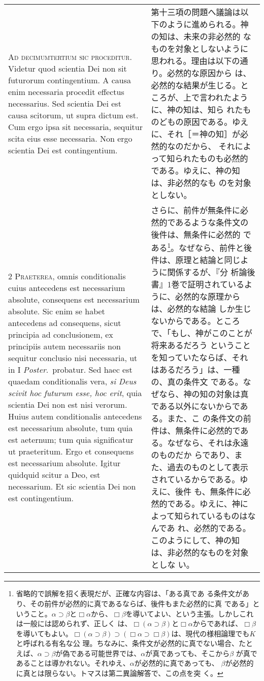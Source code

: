 \documentclass[10pt]{jsarticle} %
\begin{document}
\begin{longtable}{p{21em}p{21em}}


{\huge A}{\scshape d decimumtertium sic proceditur}. Videtur quod
scientia Dei non sit futurorum contingentium. A causa enim necessaria
procedit effectus necessarius. Sed scientia Dei est causa scitorum, ut
supra dictum est. Cum ergo ipsa sit necessaria, sequitur scita eius
esse necessaria. Non ergo scientia Dei est contingentium.

&

第十三項の問題へ議論は以下のように進められる。神の知は、未来の非必然的
なものを対象としないように思われる。理由は以下の通り。必然的な原因から
は、必然的な結果が生じる。ところが、上で言われたように、神の知は、知ら
れたものどもの原因である。ゆえに、それ［＝神の知］が必然的なのだから、
それによって知られたものも必然的である。ゆえに、神の知は、非必然的なも
のを対象としない。

\\


2 {\scshape Praeterea}, omnis conditionalis cuius antecedens est
necessarium absolute, consequens est necessarium absolute. Sic enim se
habet antecedens ad consequens, sicut principia ad conclusionem, ex
principiis autem necessariis non sequitur conclusio nisi necessaria,
ut in I {\itshape Poster}.~probatur. Sed haec est quaedam
conditionalis vera, {\itshape si Deus scivit hoc futurum esse, hoc
erit}, quia scientia Dei non est nisi verorum. Huius autem
conditionalis antecedens est necessarium absolute, tum quia est
aeternum; tum quia significatur ut praeteritum. Ergo et consequens est
necessarium absolute. Igitur quidquid scitur a Deo, est
necessarium. Et sic scientia Dei non est contingentium.


&

さらに、前件が無条件に必然的であるような条件文の後件は、無条件に必然的
である\footnote{省略的で誤解を招く表現だが、正確な内容は、「ある真であ
る条件文があり、その前件が必然的に真であるならば、後件もまた必然的に真
である」ということ。$\alpha \supset \beta$と$\Box \alpha$から、$\Box
\beta$を導いてよい、という主張。しかしこれは一般には認められず、正しく
は、$\Box (\alpha \supset \beta)$と$\Box \alpha$からであれば、$\Box
\beta$を導いてもよい。$\Box (\alpha \supset \beta) \supset (\Box
\alpha \supset \Box \beta)$は、現代の様相論理でも$K$と呼ばれる有名な公
理。ちなみに、条件文が必然的に真でない場合、たとえば、$\alpha \supset
\beta$が偽である可能世界では、$\alpha$が真であっても、そこから$\beta$
が真であることは導かれない。それゆえ、$\alpha$が必然的に真であっても、
$\beta$が必然的に真とは限らない。トマスは第二異論解答で、この点を突
く。}。なぜなら、前件と後件は、原理と結論と同じように関係するが、『分
析論後書』1巻で証明されているように、必然的な原理からは、必然的な結論
しか生じないからである。ところで、「もし、神がこのことが将来あるだろう
ということを知っていたならば、それはあるだろう」は、一種の、真の条件文
である。なぜなら、神の知の対象は真である以外にないからである。また、こ
の条件文の前件は、無条件に必然的である。なぜなら、それは永遠のものだか
らであり、また、過去のものとして表示されているからである。ゆえに、後件
も、無条件に必然的である。ゆえに、神によって知られているものはなんであ
れ、必然的である。このようにして、神の知は、非必然的なものを対象としな
い。


\end{longtable}
\end{document}
